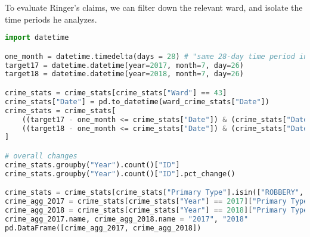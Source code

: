 \documentclass[11pt]{article}
\begin{document}
To evaluate Ringer's claims, we can filter down the relevant ward, and isolate the time periods he analyzes.
\begin{lstlisting}[language=Python,numbers=none]
import datetime

one_month = datetime.timedelta(days = 28) # "same 28-day time period in just one year"
target17 = datetime.datetime(year=2017, month=7, day=26)
target18 = datetime.datetime(year=2018, month=7, day=26)

crime_stats = crime_stats[crime_stats["Ward"] == 43]
crime_stats["Date"] = pd.to_datetime(ward_crime_stats["Date"])
crime_stats = crime_stats[
    ((target17 - one_month <= crime_stats["Date"]) & (crime_stats["Date"] <= target17)) | 
    ((target18 - one_month <= crime_stats["Date"]) & (crime_stats["Date"] <= target18))
]

# overall changes
crime_stats.groupby("Year").count()["ID"]
crime_stats.groupby("Year").count()["ID"].pct_change()

crime_stats = crime_stats[crime_stats["Primary Type"].isin(["ROBBERY", "BATTERY", "BURGLARY", "MOTOR VEHICLE THEFT"])]
crime_agg_2017 = crime_stats[crime_stats["Year"] == 2017]["Primary Type"].value_counts()
crime_agg_2018 = crime_stats[crime_stats["Year"] == 2018]["Primary Type"].value_counts()
crime_agg_2017.name, crime_agg_2018.name = "2017", "2018"
pd.DataFrame([crime_agg_2017, crime_agg_2018])
\end{lstlisting}
\end{document}
